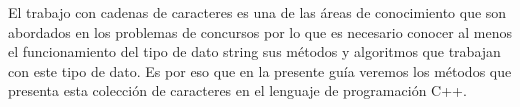 El trabajo con cadenas de caracteres es una de las áreas de conocimiento que son abordados en
los problemas de concursos por lo que es necesario conocer al menos el funcionamiento del tipo de dato string sus métodos y algoritmos que trabajan con este tipo de dato. Es por eso que en la presente guía veremos los métodos que presenta esta colección de caracteres en el lenguaje de programación C++. 